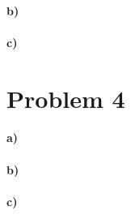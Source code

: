 \documentclass[12pt]{article}
\begin{document}
\paragraph{b)}

\paragraph{c)}

\section*{Problem 4}

\paragraph{a)}

\paragraph{b)}

\paragraph{c)}
\end{document}

